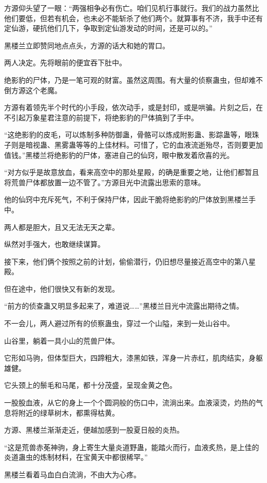 \begin{this_body}
方源仰头望了一眼：“两强相争必有伤亡。咱们见机行事就行。我们的战力虽然比他们要低，但若有机会，也未必不能斩杀了他们两个。就算事有不济，我手中还有定仙游，硬抗他们几下，争取到定仙游发动的时间，还是可以的。”

黑楼兰立即赞同地点点头，方源的话大和她的胃口。

两人决定。先将眼前的便宜吞下肚中。

绝影豹的尸体，乃是一笔可观的财富。虽然这周围。有大量的侦察蛊虫，但却难不倒方源这个老魔。

方源有着领先半个时代的小手段，依次动手，或是封印，或是哄骗。片刻之后，在不引起万象星君注意的前提下，将绝影豹的尸体搞到了手中。

“这绝影豹的皮毛，可以炼制多种防御蛊，骨骼可以炼成附影蛊、影踪蛊等，眼珠子则是暗视蛊、黑雾蛊等等的上佳材料。可惜了，它的血液流逝殆尽，否则要更加值钱。”黑楼兰将绝影豹的尸体，塞进自己的仙窍，眼中散发着欣喜的光。

“对方似乎是故意放血，看来高空中的那处星殿，的确是重要之地，让他们都暂且将荒兽尸体都放置一边不管了。”方源目光中流露出思索的意味。

他的仙窍中充斥死气，不利于保持尸体，因此干脆将绝影豹的尸体放到黑楼兰手中。

两人都是胆大，且又无法无天之辈。

纵然对手强大，也敢继续谋算。

接下来，他们俩个按照之前的计划，偷偷潜行，仍旧想尽量接近高空中的第八星殿。

但在途中，他们很快又有新的发现。

“前方的侦查蛊又明显多起来了，难道说……”黑楼兰目光中流露出期待之情。

不一会儿，两人避过所有的侦察蛊虫，穿过一个山隘，来到一处山谷中。

山谷里，躺着一具小山的荒兽尸体。

它形如马驹，但体型巨大，四蹄粗大，漆黑如铁，浑身一片赤红，肌肉结实，身躯雄健。

它头颈上的鬃毛和马尾，都十分茂盛，呈现金黄之色。

一股股血液，从它的身上一个个圆洞般的伤口中，流淌出来。血液滚烫，灼热的气息将附近的绿草树木，都熏得枯黄。

方源、黑楼兰渐渐走近，便越加感到一股夏日般的炎热。

“这是荒兽赤莬神驹，身上寄生大量炎道野蛊，能踏火而行，血液炙热，是上佳的炎道蛊虫的炼制材料，在宝黄天中都很稀罕。”

黑楼兰看着马血白白流淌，不由大为心疼。


\end{this_body}
